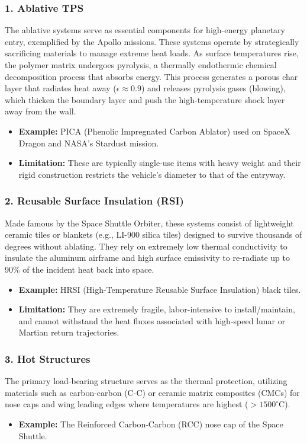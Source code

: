 \subsubsection*{1. Ablative TPS}
The ablative systems serve as essential components for high-energy planetary entry, exemplified by the Apollo missions. These systems operate by strategically sacrificing materials to manage extreme heat loads. As surface temperatures rise, the polymer matrix undergoes pyrolysis, a thermally endothermic chemical decomposition process that absorbs energy. This process generates a porous char layer that radiates heat away ($\epsilon \approx 0.9$) and releases pyrolysis gases (blowing), which thicken the boundary layer and push the high-temperature shock layer away from the wall.
\begin{itemize}
    \item \textbf{Example:} PICA (Phenolic Impregnated Carbon Ablator) used on SpaceX Dragon and NASA's Stardust mission.

    \item \textbf{Limitation:} These are typically single-use items with heavy weight and their rigid construction restricts the vehicle's diameter to that of the entryway.
\end{itemize}



\subsubsection*{2. Reusable Surface Insulation (RSI)}
Made famous by the Space Shuttle Orbiter, these systems consist of lightweight ceramic tiles or blankets (e.g., LI-900 silica tiles) designed to survive thousands of degrees without ablating. They rely on extremely low thermal conductivity to insulate the aluminum airframe and high surface emissivity to re-radiate up to 90\% of the incident heat back into space.
\begin{itemize}
    \item \textbf{Example:} HRSI (High-Temperature Reusable Surface Insulation) black tiles.

    \item \textbf{Limitation:} They are extremely fragile, labor-intensive to install/maintain, and cannot withstand the heat fluxes associated with high-speed lunar or Martian return trajectories.
\end{itemize}

\subsubsection*{3. Hot Structures}
The primary load-bearing structure serves as the thermal protection, utilizing materials such as carbon-carbon (C-C) or ceramic matrix composites (CMCs) for nose caps and wing leading edges where temperatures are highest ($> 1500^\circ$C).
\begin{itemize}
    \item \textbf{Example:} The Reinforced Carbon-Carbon (RCC) nose cap of the Space Shuttle.
\end{itemize}

